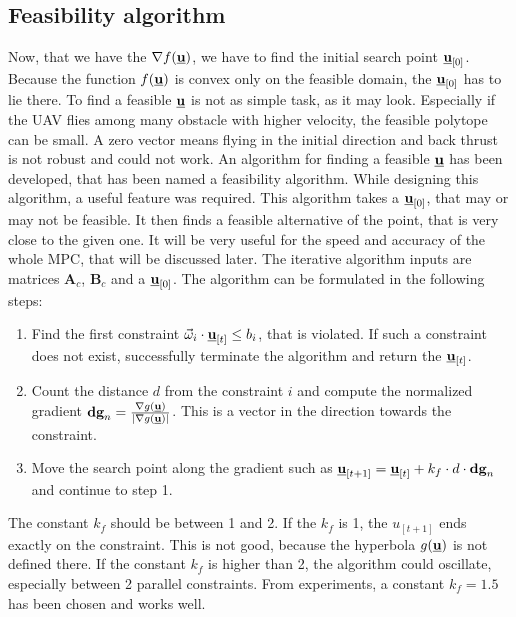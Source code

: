 \documentclass[a4paper,11pt,titlepage]{article}
\newcommand{\uvec}{\textbf{\underline{u}}}
\newcommand{\macf}{f(\uvec)}
\newcommand{\macg}{g(\uvec)}
\newcommand{\macoi}{\vec{\omega}_i}
\begin{document}
\subsection{Feasibility algorithm}
Now, that we have the $\nabla \macf$, we have to find the initial search point $\uvec_{[0]}$. Because the function $\macf$ is convex only on the feasible domain, the $\uvec_{[0]}$ has to lie there. To find a feasible $\uvec$ is not as simple task, as it may look. Especially if the UAV flies among many obstacle with higher velocity, the feasible polytope can be small. A zero vector means flying in the initial direction and back thrust is not robust and could not work. An algorithm for finding a feasible $\uvec$ has been developed, that has been named a feasibility algorithm. While designing this algorithm, a useful feature was required. This algorithm takes a $\uvec_{[0]}$, that may or may not be feasible. It then finds a feasible alternative of the point, that is very close to the given one. It will be very useful for the speed and accuracy of the whole MPC, that will be discussed later. The iterative algorithm inputs are matrices $\textbf{A}_c$, $\textbf{B}_c$ and a $\uvec_{[0]}$. The algorithm can be formulated in the following steps:

\begin{enumerate}
\item Find the first constraint $\macoi \cdot \uvec_{[t]} \leq b_i$, that is violated. If such a constraint does not exist, successfully terminate the algorithm and return the $\uvec_{[t]}$.

\item Count the distance $d$ from the constraint $i$ and compute the normalized gradient $\textbf{dg}_n = \frac{\nabla \macg}{|\nabla \macg|}$. This is a vector in the direction towards the constraint.

\item Move the search point along the gradient such as $\uvec_{[t+1]} = \uvec_{[t]} + k_f \cdot d \cdot \textbf{dg}_n$ and continue to step 1.
\end{enumerate}

The constant $k_f$ should be between 1 and 2. If the $k_f$ is 1, the $u_{[t+1]}$ ends exactly on the constraint. This is not good, because the hyperbola $\macg$ is not defined there. If the constant $k_f$ is higher than 2, the algorithm could oscillate, especially between 2 parallel constraints. From experiments, a constant $k_f = 1.5$ has been chosen and works well.
\end{document}
